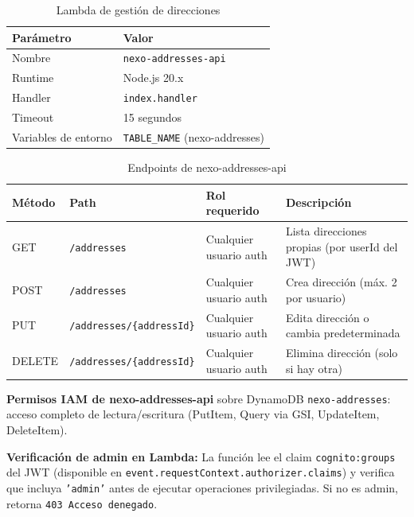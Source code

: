 \documentclass[12pt,a4paper]{article}
\begin{document}
\begin{table}[H]
\centering
\begin{tabular}{@{}ll@{}}
\toprule
\textbf{Parámetro} & \textbf{Valor} \\
\midrule
Nombre & \texttt{nexo-addresses-api} \\
Runtime & Node.js 20.x \\
Handler & \texttt{index.handler} \\
Timeout & 15 segundos \\
Variables de entorno & \texttt{TABLE\_NAME} (nexo-addresses) \\
\bottomrule
\end{tabular}
\caption{Lambda de gestión de direcciones}
\end{table}

\begin{table}[H]
\centering
\begin{tabular}{@{}llll@{}}
\toprule
\textbf{Método} & \textbf{Path} & \textbf{Rol requerido} & \textbf{Descripción} \\
\midrule
GET    & \texttt{/addresses} & Cualquier usuario auth & Lista direcciones propias (por userId del JWT) \\
POST   & \texttt{/addresses} & Cualquier usuario auth & Crea dirección (máx. 2 por usuario) \\
PUT    & \texttt{/addresses/\{addressId\}} & Cualquier usuario auth & Edita dirección o cambia predeterminada \\
DELETE & \texttt{/addresses/\{addressId\}} & Cualquier usuario auth & Elimina dirección (solo si hay otra) \\
\bottomrule
\end{tabular}
\caption{Endpoints de nexo-addresses-api}
\end{table}

\begin{nexobox}
\textbf{Permisos IAM de nexo-addresses-api} sobre DynamoDB \texttt{nexo-addresses}:
acceso completo de lectura/escritura (PutItem, Query via GSI, UpdateItem, DeleteItem).
\end{nexobox}

\begin{nexobox}
\textbf{Verificación de admin en Lambda:} La función lee el claim
\texttt{cognito:groups} del JWT (disponible en
\texttt{event.requestContext.authorizer.claims}) y verifica que incluya
\texttt{'admin'} antes de ejecutar operaciones privilegiadas. Si no es admin,
retorna \texttt{403 Acceso denegado}.
\end{nexobox}
\end{document}
